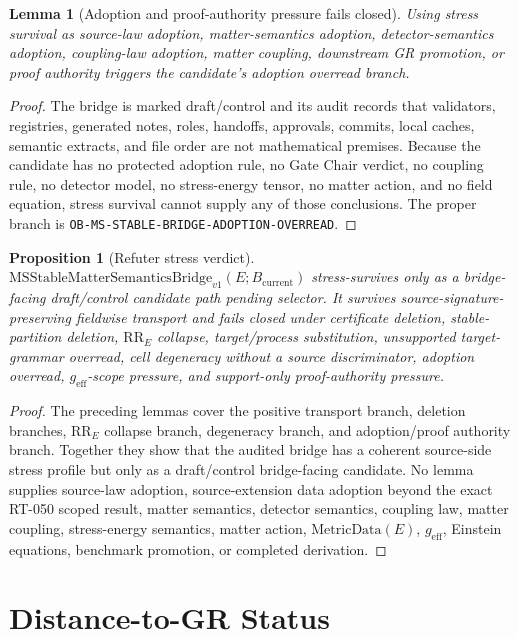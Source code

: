 \documentclass[11pt]{article}
\newcommand{\Bcur}{B_{\mathrm{current}}}
\newcommand{\MSBridge}{\mathrm{MSStableMatterSemanticsBridge}_{v1}}
\newcommand{\MetricData}{\mathrm{MetricData}}
\newcommand{\geff}{g_{\mathrm{eff}}}
\newtheorem{lemma}{Lemma}
\newtheorem{proposition}{Proposition}
\begin{document}
\begin{lemma}[Adoption and proof-authority pressure fails closed]
Using stress survival as source-law adoption, matter-semantics adoption,
detector-semantics adoption, coupling-law adoption, matter coupling,
downstream GR promotion, or proof authority triggers the candidate's adoption
overread branch.
\end{lemma}

\begin{proof}
The bridge is marked draft/control and its audit records that validators,
registries, generated notes, roles, handoffs, approvals, commits, local
caches, semantic extracts, and file order are not mathematical premises.
Because the candidate has no protected adoption rule, no Gate Chair verdict,
no coupling rule, no detector model, no stress-energy tensor, no matter
action, and no field equation, stress survival cannot supply any of those
conclusions. The proper branch is
\texttt{OB-MS-STABLE-BRIDGE-ADOPTION-OVERREAD}.
\end{proof}

\begin{proposition}[Refuter stress verdict]
\(\MSBridge(E;\Bcur)\) stress-survives only as a bridge-facing draft/control
candidate path pending selector. It survives source-signature-preserving
fieldwise transport and fails closed under certificate deletion,
stable-partition deletion, \(\mathrm{RR}_E\) collapse, target/process
substitution, unsupported target-grammar overread, cell degeneracy without a
source discriminator, adoption overread, \(\geff\)-scope pressure, and
support-only proof-authority pressure.
\end{proposition}

\begin{proof}
The preceding lemmas cover the positive transport branch, deletion branches,
\(\mathrm{RR}_E\) collapse branch, degeneracy branch, and adoption/proof
authority branch. Together they show that the audited bridge has a coherent
source-side stress profile but only as a draft/control bridge-facing candidate.
No lemma supplies source-law adoption, source-extension data adoption beyond
the exact RT-050 scoped result, matter semantics, detector semantics, coupling
law, matter coupling, stress-energy semantics, matter action, \(\MetricData(E)\),
\(\geff\), Einstein equations, benchmark promotion, or completed derivation.
\end{proof}

\section{Distance-to-GR Status}
\end{document}
